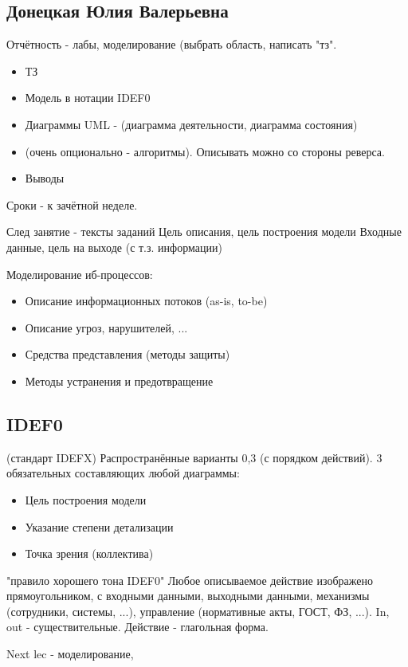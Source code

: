 \documentclass[a4paper,12pt]{report}
\begin{document}
	\def \nocredits {}
	\def \LineE {Конспект по дисциплине}
	\def \LineF {Информационные технологии}

	\maketitle


\subsection*{Донецкая Юлия Валерьевна}


	Отчётность  - лабы, моделирование (выбрать область, написать "тз".
	\begin{itemize}	
	\item	ТЗ	
	\item	Модель в нотации IDEF0
	\item	Диаграммы UML - (диаграмма деятельности, диаграмма состояния)
	\item	(очень опционально - алгоритмы). Описывать можно со стороны реверса.
	\item	Выводы
	\end{itemize}
	
	Сроки - к зачётной неделе.
	
	След занятие - тексты заданий
	Цель описания, цель построения модели
	Входные данные, цель на выходе (с т.з. информации)

	Моделирование иб-процессов:
	\begin{itemize}
	\item	Описание информационных потоков (as-is, to-be)
	\item	Описание угроз, нарушителей, ...
	\item	Средства представления (методы защиты)
	\item	Методы устранения и предотвращение
	\end{itemize}


	\subsection{IDEF0}
	(стандарт IDEFX) Распространённые варианты 0,3 (с порядком действий).
	3 обязательных составляющих любой диаграммы:
	\begin{itemize}
	\item	Цель построения модели
	\item	Указание степени детализации
	\item	Точка зрения (коллектива)
	\end{itemize}
	
	"правило хорошего тона IDEF0" 
	Любое описываемое действие изображено прямоугольником, с входными данными, выходными данными, механизмы (сотрудники, системы, ...), управление (нормативные акты, ГОСТ, ФЗ, ...).
	In, out - существительные. Действие - глагольная форма.
	
	Next lec - моделирование, 
\end{document}
